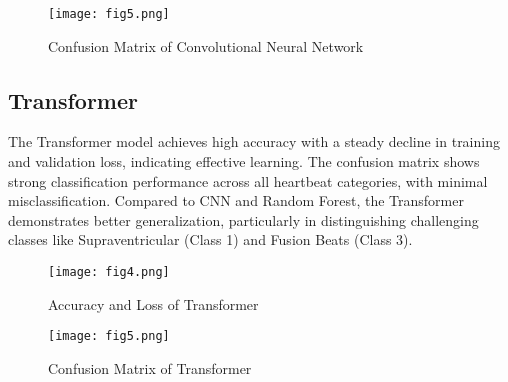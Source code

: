 \documentclass[11pt,a4paper,twoside]{article}
\begin{document}
\begin{figure}[!h]
	\centering
	\texttt{[image: fig5.png]}
	\caption{Confusion Matrix of Convolutional Neural Network}
	\label{f5}
\end{figure}


\subsection{Transformer}
The Transformer model achieves high accuracy with a steady decline in training and validation loss, indicating effective learning. The confusion matrix shows strong classification performance across all heartbeat categories, with minimal misclassification. Compared to CNN and Random Forest, the Transformer demonstrates better generalization, particularly in distinguishing challenging classes like Supraventricular (Class 1) and Fusion Beats (Class 3).

\begin{figure}[!h]
	\centering
	\texttt{[image: fig4.png]}
	\caption{Accuracy and Loss of Transformer}
	\label{f6}
\end{figure}


\begin{figure}[!h]
	\centering
	\texttt{[image: fig5.png]}
	\caption{Confusion Matrix of Transformer}
	\label{f7}
\end{figure}
\end{document}
